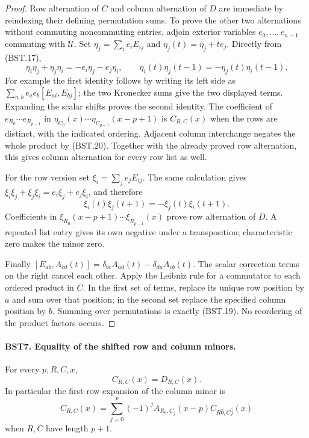 \documentclass[11pt,a4paper]{article}
\numberwithin{equation}{section}
\theoremstyle{remark}\newtheorem{remark}[theorem]{Remark}
\begin{document}
\begin{proof}
Row alternation of $C$ and column alternation of $D$ are immediate
by reindexing their defining permutation sums.  To prove the other
two alternations without commuting noncommuting entries, adjoin
exterior variables $e_0,\ldots,e_{n-1}$ commuting with $\mathcal U$.
Set
$\eta_j=\sum_i e_iE_{ij}$ and $\eta_j(t)=\eta_j+te_j$.
Directly from (BST.17),
\[
 \eta_i\eta_j+\eta_j\eta_i=-e_i\eta_j-e_j\eta_i,
 \qquad
 \eta_i(t)\eta_j(t-1)=-\eta_j(t)\eta_i(t-1).
 \tag{BST.20}
\]
For example the first identity follows by writing its left side as
$\sum_{a,b}e_ae_b[E_{ai},E_{bj}]$; the two Kronecker sums give
the two displayed terms.  Expanding the scalar shifts proves the
second identity.  The coefficient of
$e_{R_0}\cdots e_{R_{p-1}}$ in
$\eta_{C_0}(x)\cdots\eta_{C_{p-1}}(x-p+1)$ is
$C_{R,C}(x)$ when the rows are distinct, with the indicated ordering.
Adjacent column interchange negates the whole product by (BST.20).
Together with the already proved row alternation, this gives column
alternation for every row list as well.

For the row version set $\xi_i=\sum_j e_jE_{ij}$.
The same calculation gives
$\xi_i\xi_j+\xi_j\xi_i=e_i\xi_j+e_j\xi_i$, and therefore
\[
       \xi_i(t)\xi_j(t+1)=-\xi_j(t)\xi_i(t+1).
 \tag{BST.21}
\]
Coefficients in
$\xi_{R_0}(x-p+1)\cdots\xi_{R_{p-1}}(x)$ prove row alternation of
$D$.  A repeated list entry gives its own negative under a
transposition; characteristic zero makes the minor zero.

Finally
$[E_{ab},A_{cd}(t)]=
\delta_{bc}A_{ad}(t)-\delta_{da}A_{cb}(t)$.
The scalar correction terms on the right cancel each other.
Apply the Leibniz rule for a commutator to each ordered product
in $C$.  In the first set of terms, replace its unique row position
by $a$ and sum over that position; in the second set replace the
specified column position by $b$.  Summing over permutations is
exactly (BST.19).  No reordering of the product factors occurs.
\end{proof}

\paragraph{BST7. Equality of the shifted row and column minors.}
\label{claim:BST7}
For every $p,R,C,x$,
\[
                         C_{R,C}(x)=D_{R,C}(x).
 \tag{BST.22}
\]
In particular the first-row expansion of the column minor is
\[
 C_{R,C}(x)=
 \sum_{j=0}^{p}(-1)^j A_{R_0,C_j}(x-p)
           C_{R\widehat{0},C\widehat{j}}(x)
 \tag{BST.23}
\]
when $R,C$ have length $p+1$.
\end{document}
